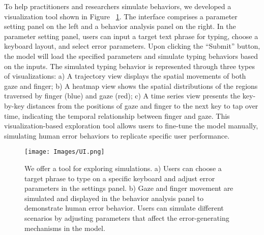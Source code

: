 To help practitioners and researchers simulate behaviors, we developed a visualization tool shown in Figure ~\ref{fig:UI}. 
The interface comprises a parameter setting panel on the left and a behavior analysis panel on the right. In the parameter setting panel, users can input a target text phrase for typing, choose a keyboard layout, and select error parameters. Upon clicking the ``Submit'' button, the model will load the specified parameters and simulate typing behaviors based on the inputs. The simulated typing behavior is represented through three types of visualizations:  a) A trajectory view displays the spatial movements of both gaze and finger; b) A heatmap view shows the spatial distributions of the regions traversed by finger (blue) and gaze (red); c) A time series view presents the key-by-key distances from the positions of gaze and finger to the next key to tap over time, indicating the temporal relationship between finger and gaze. This visualization-based exploration tool allows users to fine-tune the model manually, simulating human error behaviors to replicate specific user performance.

\begin{figure}[!t]
\centering
  \texttt{[image: Images/UI.png]}
  \caption{We offer a tool for exploring simulations. a) Users can choose a target phrase to type on a specific keyboard and adjust error parameters in the settings panel. b) Gaze and finger movement are simulated and displayed in the behavior analysis panel to demonstrate human error behavior. Users can simulate different scenarios by adjusting parameters that affect the error-generating mechanisms in the model.}
  \label{fig:UI}
\end{figure}